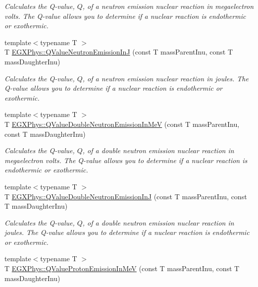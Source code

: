 \begin{DoxyCompactItemize}
\begin{DoxyCompactList}\small\item\em Calculates the Q-\/value, $Q$, of a neutron emission nuclear reaction in megaelectron volts. The Q-\/value allows you to determine if a nuclear reaction is endothermic or exothermic. \end{DoxyCompactList}\item 
{\footnotesize template$<$typename T $>$ }\\T \mbox{\hyperlink{group___e_g_x_phys-_q_value-_neutron_emission_gacb17fa06731637937bc65765943d67ca}{E\+G\+X\+Phys\+::\+Q\+Value\+Neutron\+Emission\+InJ}} (const T mass\+Parent\+Inu, const T mass\+Daughter\+Inu)
\begin{DoxyCompactList}\small\item\em Calculates the Q-\/value, $Q$, of a neutron emission nuclear reaction in joules. The Q-\/value allows you to determine if a nuclear reaction is endothermic or exothermic. \end{DoxyCompactList}\item 
{\footnotesize template$<$typename T $>$ }\\T \mbox{\hyperlink{group___e_g_x_phys-_q_value-_neutron_emission_gaeafae8a98e46b701517c1a2b8bfc241d}{E\+G\+X\+Phys\+::\+Q\+Value\+Double\+Neutron\+Emission\+In\+MeV}} (const T mass\+Parent\+Inu, const T mass\+Daughter\+Inu)
\begin{DoxyCompactList}\small\item\em Calculates the Q-\/value, $Q$, of a double neutron emission nuclear reaction in megaelectron volts. The Q-\/value allows you to determine if a nuclear reaction is endothermic or exothermic. \end{DoxyCompactList}\item 
{\footnotesize template$<$typename T $>$ }\\T \mbox{\hyperlink{group___e_g_x_phys-_q_value-_neutron_emission_gae8a2c7bd5c4facaea7615eccdfc47be1}{E\+G\+X\+Phys\+::\+Q\+Value\+Double\+Neutron\+Emission\+InJ}} (const T mass\+Parent\+Inu, const T mass\+Daughter\+Inu)
\begin{DoxyCompactList}\small\item\em Calculates the Q-\/value, $Q$, of a double neutron emission nuclear reaction in joules. The Q-\/value allows you to determine if a nuclear reaction is endothermic or exothermic. \end{DoxyCompactList}\item 
{\footnotesize template$<$typename T $>$ }\\T \mbox{\hyperlink{group___e_g_x_phys-_q_value-_proton_emission_ga5d92756e945e66bd2ed7d55145b95c3b}{E\+G\+X\+Phys\+::\+Q\+Value\+Proton\+Emission\+In\+MeV}} (const T mass\+Parent\+Inu, const T mass\+Daughter\+Inu)

\end{DoxyCompactItemize}
